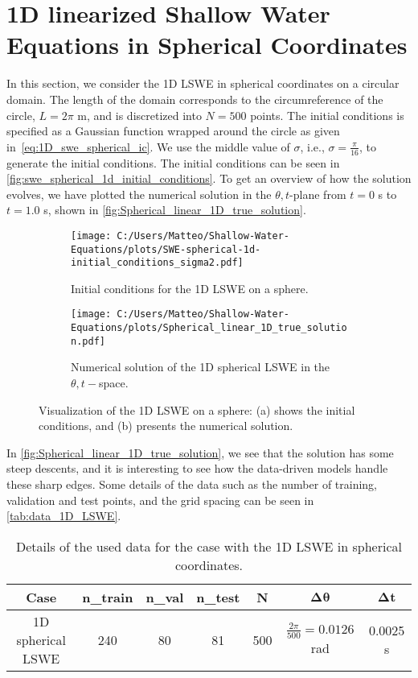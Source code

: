 \section{1D linearized Shallow Water Equations in Spherical Coordinates}
In this section, we consider the 1D LSWE in spherical coordinates on a circular domain.
The length of the domain corresponds to the circumreference of the circle, $L = 2\pi$ m, and is discretized into $N = 500$ points.
The initial conditions is specified as a Gaussian function wrapped around the circle as given in~\eqref{eq:1D_swe_spherical_ic}.
We use the middle value of $\sigma$, i.e., $\sigma = \frac{\pi}{16}$, to generate the initial conditions.
The initial conditions can be seen in \autoref{fig:swe_spherical_1d_initial_conditions}.
To get an overview of how the solution evolves, we have plotted the numerical solution in the $\theta,t$-plane from $t = 0$ s to $t = 1.0$ s, shown in \autoref{fig:Spherical_linear_1D_true_solution}.
\begin{figure}[H]
    \centering
    \begin{subfigure}[t]{0.4\textwidth} %
        \centering
        \texttt{[image: C:/Users/Matteo/Shallow-Water-Equations/plots/SWE-spherical-1d-initial\_conditions\_sigma2.pdf]}
        \caption{Initial conditions for the 1D LSWE on a sphere.}\label{fig:swe_spherical_1d_initial_conditions}
    \end{subfigure}
    \hspace{0mm} %
    \begin{subfigure}[t]{0.5\textwidth} %
        \centering
        \texttt{[image: C:/Users/Matteo/Shallow-Water-Equations/plots/Spherical\_linear\_1D\_true\_solution.pdf]}
        \caption{Numerical solution of the 1D spherical LSWE in the $\theta,t-$space.}\label{fig:Spherical_linear_1D_true_solution}
    \end{subfigure}
    \caption{Visualization of the 1D LSWE on a sphere:
    (a) shows the initial conditions, and (b) presents the numerical solution.}\label{fig:LSWE_1D_sphere}
\end{figure}
In \autoref{fig:Spherical_linear_1D_true_solution}, we see that the solution has some steep descents, and it is interesting to see how the data-driven models handle these sharp edges.
Some details of the data such as the number of training, validation and test points, and the grid spacing can be seen in \autoref{tab:data_1D_LSWE}.
\begin{table}[H]
    \centering
    \begin{tabular}{c|cccccc}
        \textbf{Case} & \textbf{n\_train} & \textbf{n\_val} & \textbf{n\_test} & \textbf{N} & $\mathbf{\Delta \theta}$ & $\mathbf{\Delta t}$ \\
        \hline
        1D spherical LSWE & 240 & 80 & 81 & 500 & $\frac{2 \pi}{500} = 0.0126$ rad  & 0.0025 s \\
    \end{tabular}
    \caption{Details of the used data for the case with the 1D LSWE in spherical coordinates.}\label{tab:data_1D_LSWE}
\end{table}

